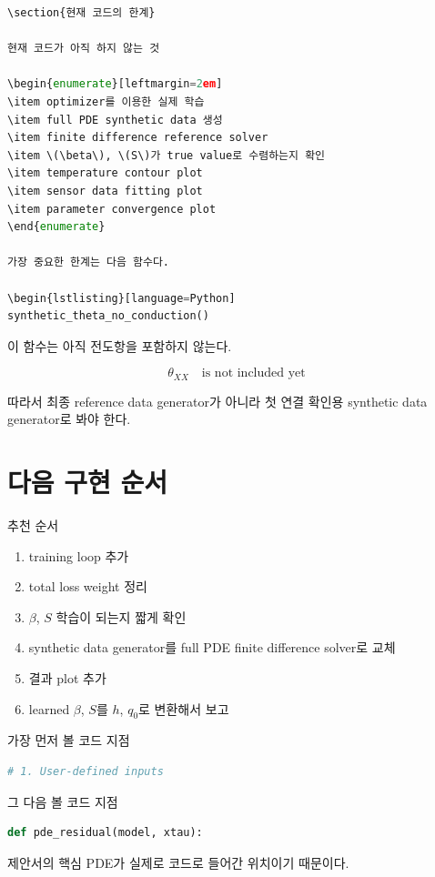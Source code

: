\documentclass[11pt]{article}
\begin{document}
\begin{lstlisting}[language=Python]
\section{현재 코드의 한계}

현재 코드가 아직 하지 않는 것

\begin{enumerate}[leftmargin=2em]
\item optimizer를 이용한 실제 학습
\item full PDE synthetic data 생성
\item finite difference reference solver
\item \(\beta\), \(S\)가 true value로 수렴하는지 확인
\item temperature contour plot
\item sensor data fitting plot
\item parameter convergence plot
\end{enumerate}

가장 중요한 한계는 다음 함수다.

\begin{lstlisting}[language=Python]
synthetic_theta_no_conduction()
\end{lstlisting}

이 함수는 아직 전도항을 포함하지 않는다.

\[
\theta_{XX} \quad \text{is not included yet}
\]

따라서 최종 reference data generator가 아니라 첫 연결 확인용 synthetic data generator로 봐야 한다.

\section{다음 구현 순서}

추천 순서

\begin{enumerate}[leftmargin=2em]
\item training loop 추가
\item total loss weight 정리
\item \(\beta\), \(S\) 학습이 되는지 짧게 확인
\item synthetic data generator를 full PDE finite difference solver로 교체
\item 결과 plot 추가
\item learned \(\beta\), \(S\)를 \(h\), \(q_0\)로 변환해서 보고
\end{enumerate}

가장 먼저 볼 코드 지점

\begin{lstlisting}[language=Python]
# 1. User-defined inputs
\end{lstlisting}

그 다음 볼 코드 지점

\begin{lstlisting}[language=Python]
def pde_residual(model, xtau):
\end{lstlisting}

제안서의 핵심 PDE가 실제로 코드로 들어간 위치이기 때문이다.
\end{document}
